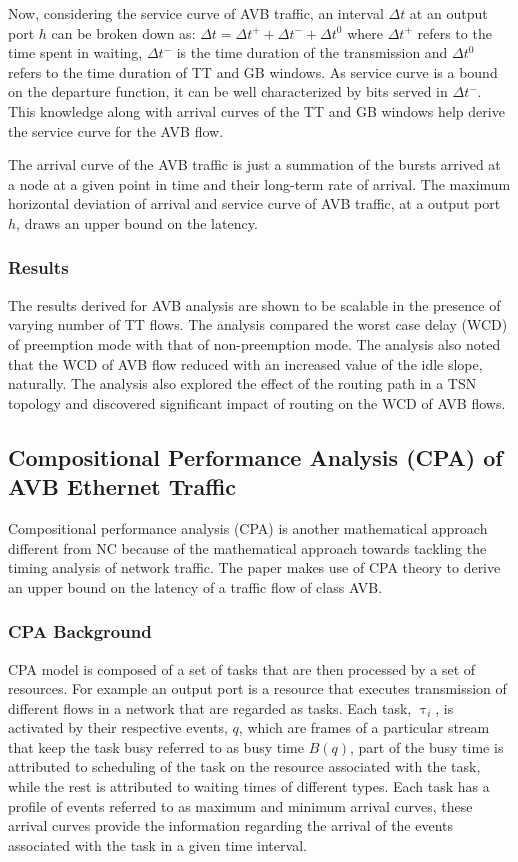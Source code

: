 \documentclass[journal,12pt,twocolumn]{IEEEtran}
\begin{document}
Now, considering the service curve of AVB traffic, an interval $\Delta t$ at an output port $h$ can be broken down as: $\Delta t =\Delta t^+ + \Delta t^- + \Delta t^0$ where $\Delta t^+$ refers to the time spent in waiting, $\Delta t^-$ is the time duration of the transmission and $\Delta t^0$ refers to the time duration of TT and GB windows. As service curve is a bound on the departure function, it can be well characterized by bits served in $\Delta t^-$. This knowledge along with arrival curves of the TT and GB windows help derive the service curve for the AVB flow.

The arrival curve of the AVB traffic is just a summation of the bursts arrived at a node at a given point in time and their long-term rate of arrival.
The maximum horizontal deviation of arrival and service curve of AVB traffic, at a output port $h$, draws an upper bound on the latency.
\subsubsection{Results}
The results derived for AVB analysis are shown to be scalable in the presence of varying number of TT flows. The analysis compared the worst case delay (WCD) of preemption mode with that of non-preemption mode. The analysis also noted that the WCD of AVB flow reduced with an increased value of the idle slope, naturally. The analysis also explored the effect of the routing path in a TSN topology and discovered significant impact of routing on the WCD of AVB flows.

\subsection {Compositional Performance Analysis (CPA) of AVB Ethernet Traffic}
Compositional performance analysis (CPA) \cite{CPA} is another mathematical approach different from NC because of the mathematical approach towards tackling the timing analysis of network traffic. The paper \cite{CPA} makes use of CPA theory to derive an upper bound on the latency of a traffic flow of class AVB.
\subsubsection{CPA Background}
CPA model is composed of a set of tasks that are then processed by a set of resources. For example an output port is a resource that executes transmission of different flows in a network that are regarded as tasks. Each task, $\uptau_i$,  is activated by their respective events, $q$, which are frames of a particular stream that keep the task busy referred to as busy time $B(q)$, part of the busy time is attributed to scheduling of the task on the resource associated with the task, while the rest is attributed to waiting times of different types. Each task has a profile of events referred to as maximum and minimum arrival curves, these arrival curves provide the information regarding the arrival of the events associated with the task in a given time interval.
\end{document}
